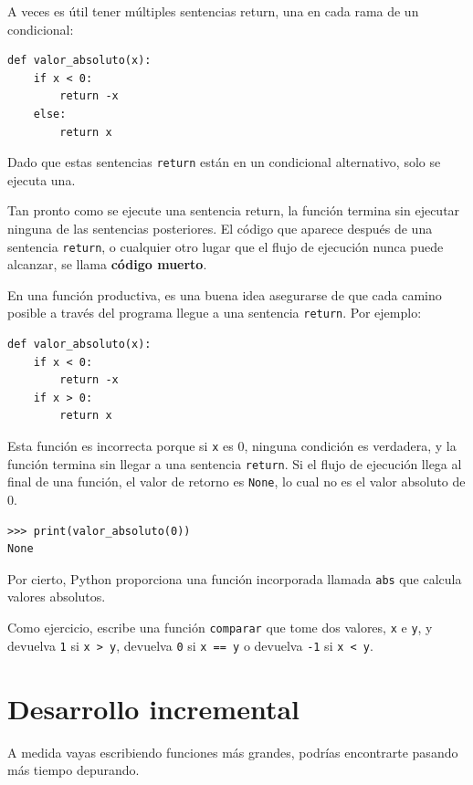 \documentclass[10pt]{book}
\begin{document}
A veces es útil tener múltiples sentencias return, una en cada
rama de un condicional:

\begin{verbatim}
def valor_absoluto(x):
    if x < 0:
        return -x
    else:
        return x
\end{verbatim}
%
Dado que estas sentencias {\tt return} están en un condicional alternativo,
solo se ejecuta una.

Tan pronto como se ejecute una sentencia return, la función
termina sin ejecutar ninguna de las sentencias posteriores.
El código que aparece después de una sentencia {\tt return}, o cualquier otro lugar
que el flujo de ejecución nunca puede alcanzar, se llama {\bf código muerto}.

En una función productiva, es una buena idea asegurarse de
que cada camino posible a través del programa llegue a una
sentencia {\tt return}.  Por ejemplo:

\begin{verbatim}
def valor_absoluto(x):
    if x < 0:
        return -x
    if x > 0:
        return x
\end{verbatim}
%
Esta función es incorrecta porque si {\tt x} es 0,
ninguna condición es verdadera, y la función termina sin llegar a una
sentencia {\tt return}.  Si el flujo de ejecución llega al final
de una función, el valor de retorno es {\tt None}, lo cual no es
el valor absoluto de 0.

\begin{verbatim}
>>> print(valor_absoluto(0))
None
\end{verbatim}
%
Por cierto, Python proporciona una función incorporada llamada
{\tt abs} que calcula valores absolutos.

Como ejercicio, escribe una función {\tt comparar} que
tome dos valores, {\tt x} e {\tt y}, y devuelva {\tt 1} si {\tt x > y},
devuelva {\tt 0} si {\tt x == y} o devuelva {\tt -1} si {\tt x < y}.


\section{Desarrollo incremental}
\label{incremental.development}

A medida vayas escribiendo funciones más grandes, podrías encontrarte
pasando más tiempo depurando.
\end{document}
